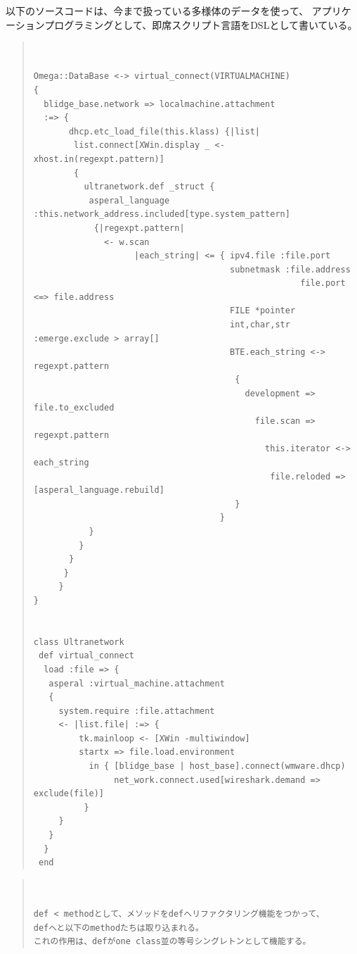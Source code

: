 \documentclass{jsarticle}
\begin{document}
以下のソースコードは、今まで扱っている多様体のデータを使って、
アプリケーションプログラミングとして、即席スクリプト言語をDSLとして書いている。
\begin{quote}
\setlength{\baselineskip}{12pt}
\begin{verbatim}


Omega::DataBase <-> virtual_connect(VIRTUALMACHINE)
{
  blidge_base.network => localmachine.attachment
  :=> {
       dhcp.etc_load_file(this.klass) {|list|
        list.connect[XWin.display _ <- xhost.in(regexpt.pattern)]
        {
          ultranetwork.def _struct {
           asperal_language :this.network_address.included[type.system_pattern]
            {|regexpt.pattern|
              <- w.scan
                    |each_string| <= { ipv4.file :file.port
                                       subnetmask :file.address
                                                     file.port <=> file.address
                                       FILE *pointer                   
                                       int,char,str :emerge.exclude > array[]
                                       BTE.each_string <-> regexpt.pattern
                                        {
                                          development => file.to_excluded
                                            file.scan => regexpt.pattern
                                              this.iterator <-> each_string
                                               file.reloded => [asperal_language.rebuild]
                                        }        
                                     }
           }   
         }
       }
      }
     } 
}


class Ultranetwork
 def virtual_connect
  load :file => {
   asperal :virtual_machine.attachment
   {
     system.require :file.attachment
     <- |list.file| :=> {
         tk.mainloop <- [XWin -multiwindow]  
         startx => file.load.environment
           in { [blidge_base | host_base].connect(wmware.dhcp)
                net_work.connect.used[wireshark.demand => exclude(file)]
          }
     }
   }
  }
 end
\end{verbatim}
\end{quote}

\begin{quote}
\setlength{\baselineskip}{12pt}
\begin{verbatim}


def < methodとして、メソッドをdefへリファクタリング機能をつかって、
defへと以下のmethodたちは取り込まれる。
これの作用は、defがone class並の等号シングレトンとして機能する。
\end{verbatim}
\end{quote}
\end{document}
